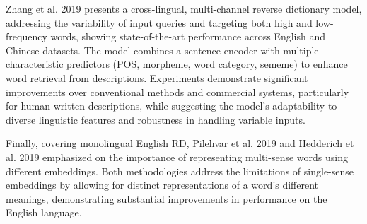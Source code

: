 \documentclass[15pt]{article}
\begin{document}
Zhang et al. 2019 presents a cross-lingual, multi-channel reverse dictionary model, addressing the variability of input queries and targeting both high and low-frequency words, showing state-of-the-art performance across English and Chinese datasets. The model combines a sentence encoder with multiple characteristic predictors (POS, morpheme, word category, sememe) to enhance word retrieval from descriptions. Experiments demonstrate significant improvements over conventional methods and commercial systems, particularly for human-written descriptions, while suggesting the model's adaptability to diverse linguistic features and robustness in handling variable inputs.

Finally, covering monolingual English RD, Pilehvar et al. 2019 and Hedderich et al. 2019 emphasized on the importance of representing multi-sense words using different embeddings. Both methodologies address the limitations of single-sense embeddings by allowing for distinct representations of a word's different meanings, demonstrating substantial improvements in performance on the English language.
\end{document}
